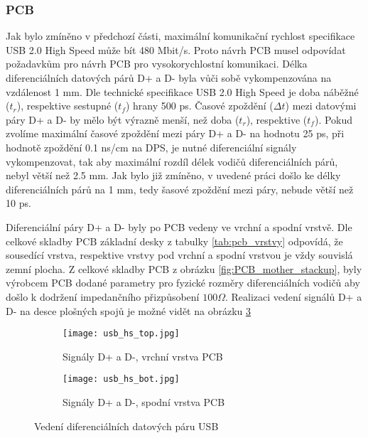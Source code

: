 	\subsubsection{PCB}
	Jak bylo zmíněno v předchozí části, maximální komunikační rychlost specifikace USB 2.0 High Speed může bít 480 Mbit/s. Proto návrh PCB musel odpovídat požadavkům pro návrh PCB pro vysokorychlostní komunikaci. Délka diferenciálních datových párů D+ a D- byla vůči sobě vykompenzována na vzdálenost 1 mm. Dle technické specifikace USB 2.0 High Speed je doba náběžné ($t_r$), respektive sestupné ($t_f$) hrany 500 ps. Časové zpoždění ($\Delta t$) mezi datovými páry D+ a D- by mělo být výrazně menší, než doba ($t_r$), respektive ($t_f$). Pokud zvolíme maximální časové zpoždění mezi páry D+ a D- na hodnotu 25 ps, při hodnotě zpoždění 0.1 ns/cm na DPS, je nutné diferenciální signály vykompenzovat, tak aby maximální rozdíl délek vodičů diferenciálních párů, nebyl větší než 2.5 mm. Jak bylo již zmíněno, v uvedené práci došlo ke délky diferenciálních párů na 1 mm, tedy šasové zpoždění mezi páry, nebude větší než 10 ps.
	\par Diferenciální páry D+ a D- byly po PCB vedeny ve vrchní a spodní vrstvě. Dle celkové skladby PCB základní desky z tabulky \ref{tab:pcb_vrstvy} odpovídá, že sousedící vrstva, respektive vrstvy pod vrchní a spodní vrstvou je vždy souvislá zemní plocha. Z celkové skladby PCB z obrázku \ref{fig:PCB_mother_stackup}, byly výrobcem PCB dodané parametry pro fyzické rozměry diferenciálních vodičů aby došlo k dodržení impedančního přizpůsobení $100 \Omega$. Realizaci vedení signálů D+ a D- na desce plošných spojů je možné vidět na obrázku \ref{fig:usb_layout}
	
	\begin{figure}[h!]
		\begin{subfigure}{0.5\textwidth}
			\centering
			\captionsetup{justification=centering}
			\texttt{[image: usb\_hs\_top.jpg]}
			\caption{Signály D+ a D-, vrchní vrstva PCB} 
			\label{fig:usb_top}
		\end{subfigure} \hfill
		\begin{subfigure}{0.5\textwidth}
			\centering
			\captionsetup{justification=centering}
			\texttt{[image: usb\_hs\_bot.jpg]}
			\caption{Signály D+ a D-, spodní vrstva PCB} 
			\label{fig:usb_bot}
		\end{subfigure}
		\caption{Vedení diferenciálních datových páru USB}
		\label{fig:usb_layout}
	\end{figure} 
